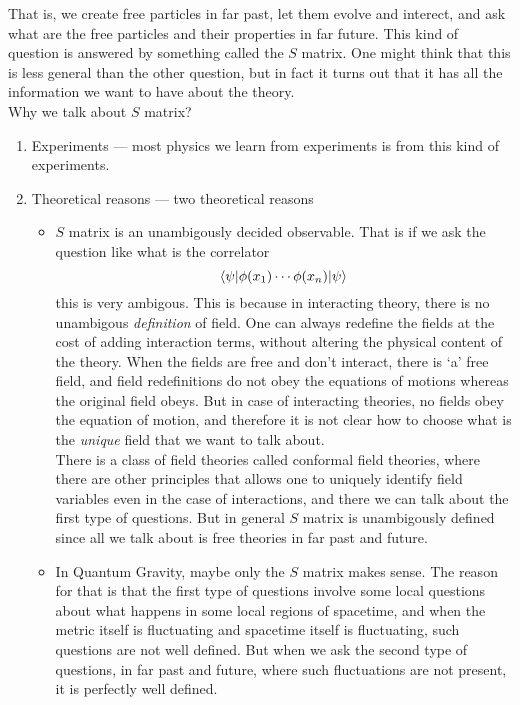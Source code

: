 \documentclass[11pt, notitlepage]{report}
\numberwithin{equation}{section}
\begin{document}
    That is, we create free particles in far past, let them evolve and interect, and ask what are the free particles and their properties in far future. This kind of question is answered by something called the \(S\) matrix. One might think that this is less general than the other question, but in fact it turns out that it has all the information we want to have about the theory. \\

    Why we talk about \(S\) matrix?
    \begin{enumerate}
        \item Experiments — most physics we learn from experiments is from this kind of experiments. 
        \item Theoretical reasons — two theoretical reasons \begin{itemize}
            \item \(S\) matrix is an unambigously decided observable. That is if we ask the question like what is the correlator 
            \begin{equation*}
                \braket{\psi | \phi(x_1) \cdots \phi(x_n)| \psi}
            \end{equation*}
            this is very ambigous. This is because in interacting theory, there is no unambigous \textit{definition} of field. One can always redefine the fields at the cost of adding interaction terms, without altering the physical content of the theory. When the fields are free and don't interact, there is `a' free field, and field redefinitions do not obey the equations of motions whereas the original field obeys. But in case of interacting theories, no fields obey the equation of motion, and therefore it is not clear how to choose what is the \textit{unique} field that we want to talk about.\\
            There is a class of field theories called conformal field theories, where there are other principles that allows one to uniquely identify field variables even in the case of interactions, and there we can talk about the first type of questions. But in general \(S\) matrix is unambigously defined since all we talk about is free theories in far past and future.
            \item In Quantum Gravity, maybe only the \(S\) matrix makes sense. The reason for that is that the first type of questions involve some local questions about what happens in some local regions of spacetime, and when the metric itself is fluctuating and spacetime itself is fluctuating, such questions are not well defined. But when we ask the second type of questions, in far past and future, where such fluctuations are not present, it is perfectly well defined. 
        \end{itemize}
    \end{enumerate}
\end{document}
